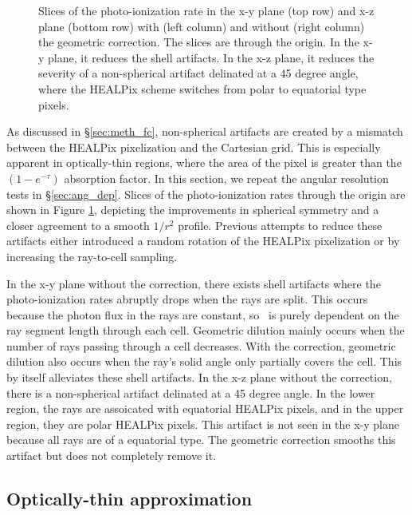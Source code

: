 \documentclass[12pt,preprint]{aastex}
\begin{document}
\begin{figure}[t]
  \caption{\label{fig:fc_slices} Slices of the photo-ionization rate
    in the x-y plane (top row) and x-z plane (bottom row) with (left
    column) and without (right column) the geometric correction.  The
    slices are through the origin.  In the x-y plane, it reduces the
    shell artifacts.  In the x-z plane, it reduces the severity of a
    non-spherical artifact delinated at a 45 degree angle, where the
    HEALPix scheme switches from polar to equatorial type pixels.}
\end{figure}

As discussed in \S\ref{sec:meth_fc}, non-spherical artifacts are
created by a mismatch between the HEALPix pixelization and the
Cartesian grid.  This is especially apparent in optically-thin
regions, where the area of the pixel is greater than the
$(1-e^{-\tau})$ absorption factor.  In this section, we repeat the
angular resolution tests in \S\ref{sec:ang_dep}.  Slices of the
photo-ionization rates through the origin are shown in Figure
\ref{fig:fc_slices}, depicting the improvements in spherical symmetry
and a closer agreement to a smooth $1/r^2$ profile.  Previous attempts
to reduce these artifacts either introduced a random rotation of the
HEALPix pixelization \citep[e.g.][]{Abel02_RT, Trac07, Krumholz07_ART}
or by increasing the ray-to-cell sampling.

In the x-y plane without the correction, there exists shell artifacts
where the photo-ionization rates abruptly drops when the rays are
split.  This occurs because the photon flux in the rays are constant,
so \kph~is purely dependent on the ray segment length through each
cell.  Geometric dilution mainly occurs when the number of rays
passing through a cell decreases.  With the correction, geometric
dilution also occurs when the ray's solid angle only partially covers
the cell.  This by itself alleviates these shell artifacts.  In the
x-z plane without the correction, there is a non-spherical artifact
delinated at a 45 degree angle.  In the lower region, the rays are
assoicated with equatorial HEALPix pixels, and in the upper region,
they are polar HEALPix pixels.  This artifact is not seen in the x-y
plane because all rays are of a equatorial type.  The geometric
correction smooths this artifact but does not completely remove it.

\subsection{Optically-thin approximation}
\end{document}
